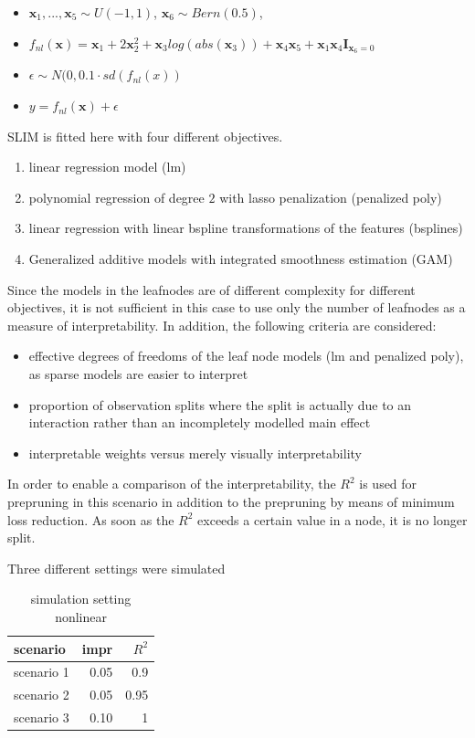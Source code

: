 \begin{itemize}
    \item $\textbf{x}_1, ..., \textbf{x}_5 \sim U(-1,1)$, $\textbf{x}_6 \sim Bern(0.5)$, 
    \item $ f_{nl}(\textbf{x}) = \textbf{x}_1 + 2 \textbf{x}_2^2 + \textbf{x}_3log(abs(\textbf{x}_3)) + \textbf{x}_4\textbf{x}_5 + \textbf{x}_1\textbf{x}_4\mathbf{I}_{\textbf{x}_6 = 0}$
    \item $\epsilon \sim N(0,  0.1 \cdot sd(f_{nl}(x))$
    \item $y = f_{nl}(\textbf{x}) + \epsilon$     
\end{itemize}

SLIM is fitted here with four different objectives.
\begin{enumerate}
    \item linear regression model (lm)
    \item polynomial regression of degree $2$ with lasso penalization (penalized poly)
    \item linear regression with linear bspline transformations of the features (bsplines)
    \item Generalized additive models with integrated smoothness estimation \citep{Wood.2011} (GAM)
\end{enumerate}


Since the models in the leafnodes are of different complexity for different objectives, it is not sufficient in this case to use only the number of leafnodes as a measure of interpretability. In addition, the following criteria are considered:
\begin{itemize}
    \item effective degrees of freedoms of the leaf node models (lm and penalized poly), as sparse models are easier to interpret
    \item proportion of observation splits where the split is actually due to an interaction rather than an incompletely modelled main effect
    \item interpretable weights versus merely visually interpretability
\end{itemize}

In order to enable a comparison of the interpretability, the $R^2$ is used for prepruning in this scenario in addition to the prepruning by means of minimum loss reduction. As soon as the $R^2$ exceeds a certain value in a node, it is no longer split. 

Three different settings were simulated
\begin{table}[!htt]
    \centering
    \begin{tabular}{l|r|r}
        \hline
        scenario  &  impr & $R^2$ \\
        \hline
        scenario 1 & 0.05 & 0.9 \\
        scenario 2 & 0.05 & 0.95 \\
        scenario 3 & 0.10 & 1  \\
        \hline

    \end{tabular}
    \caption{simulation setting nonlinear}
\end{table}

